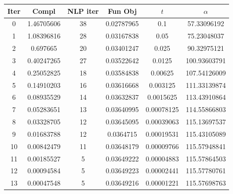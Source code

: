 \begin{tabular}{c c c c c c}
\toprule
Iter & Compl & NLP iter & Fun Obj & $t$ & $\alpha$ \\
\midrule
0 & 1.46705606 & 38 & 0.02787965 & 0.1 & 57.33096192 \\
1 & 1.08396816 & 28 & 0.03167838 & 0.05 & 75.23048037 \\
2 & 0.697665 & 20 & 0.03401247 & 0.025 & 90.32975121 \\
3 & 0.40247265 & 27 & 0.03522642 & 0.0125 & 100.93603791 \\
4 & 0.25052825 & 18 & 0.03584838 & 0.00625 & 107.54126009 \\
5 & 0.14910203 & 16 & 0.03616668 & 0.003125 & 111.33139874 \\
6 & 0.08935529 & 14 & 0.03632837 & 0.0015625 & 113.43910864 \\
7 & 0.05283651 & 13 & 0.03640995 & 0.00078125 & 114.55866803 \\
8 & 0.03328705 & 12 & 0.03645095 & 0.00039063 & 115.13697537 \\
9 & 0.01683788 & 12 & 0.0364715 & 0.00019531 & 115.43105089 \\
10 & 0.00842479 & 11 & 0.03648179 & 0.00009766 & 115.57948841 \\
11 & 0.00185527 & 5 & 0.03649222 & 0.00004883 & 115.57864503 \\
12 & 0.00094584 & 5 & 0.03649223 & 0.00002441 & 115.57780761 \\
13 & 0.00047548 & 5 & 0.03649216 & 0.00001221 & 115.57698763 \\
\bottomrule
\end{tabular}